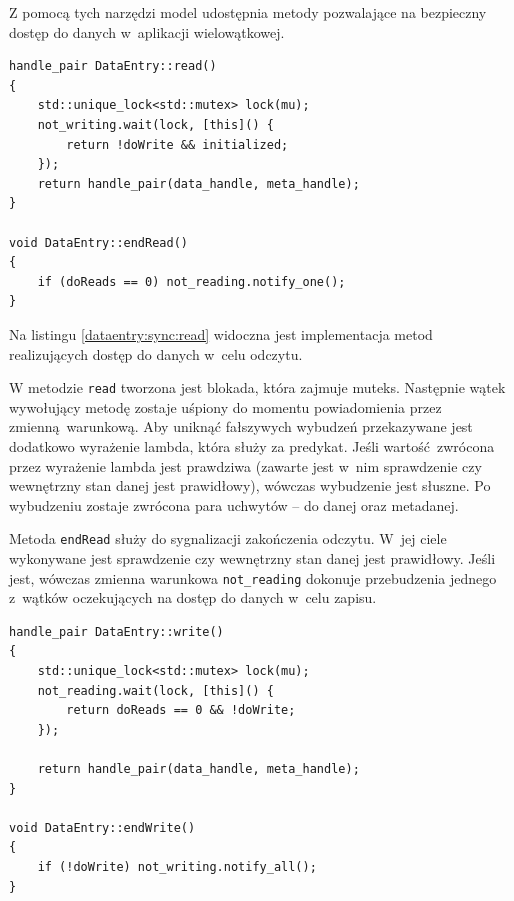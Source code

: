 Z pomocą tych narzędzi model udostępnia metody pozwalające na bezpieczny dostęp do danych w~aplikacji wielowątkowej.

\begin{minipage}{\textwidth}
	\begin{lstlisting}[label=dataentry:sync:read, caption={Metody klasy \lstinline$DataEntry$ zapewniające bezpieczny odczyt danych współdzielonych w~środowisku wielowątkowym.},alsoletter={()[].=}]
handle_pair DataEntry::read()
{
	std::unique_lock<std::mutex> lock(mu);
	not_writing.wait(lock, [this]() {
		return !doWrite && initialized;
	});
	return handle_pair(data_handle, meta_handle);
}

void DataEntry::endRead()
{
	if (doReads == 0) not_reading.notify_one();
}
	\end{lstlisting}
\end{minipage}

Na listingu \ref{dataentry:sync:read} widoczna jest implementacja metod realizujących dostęp do danych w~celu odczytu. 

W metodzie \lstinline$read$ tworzona jest blokada, która zajmuje muteks. Następnie wątek wywołujący metodę zostaje uśpiony do momentu powiadomienia przez zmienną warunkową. Aby uniknąć fałszywych wybudzeń przekazywane jest dodatkowo wyrażenie lambda, która służy za predykat. Jeśli wartość zwrócona przez wyrażenie lambda jest prawdziwa (zawarte jest w~nim sprawdzenie czy wewnętrzny stan danej jest prawidłowy), wówczas wybudzenie jest słuszne. Po wybudzeniu zostaje zwrócona para uchwytów -- do danej oraz metadanej.

Metoda \lstinline$endRead$ służy do sygnalizacji zakończenia odczytu. W~jej ciele wykonywane jest sprawdzenie czy wewnętrzny stan danej jest prawidłowy. Jeśli jest, wówczas zmienna warunkowa \lstinline$not_reading$ dokonuje przebudzenia jednego z~wątków oczekujących na dostęp do danych w~celu zapisu.

\begin{minipage}{\textwidth}
	\begin{lstlisting}[label=dataentry:sync:write, caption={Metody klasy \lstinline$DataEntry$ zapewniające bezpieczny zapis danych współdzielonych w~środowisku wielowątkowym.},alsoletter={()[].=}]
handle_pair DataEntry::write()
{
	std::unique_lock<std::mutex> lock(mu);
	not_reading.wait(lock, [this]() {
		return doReads == 0 && !doWrite;
	});

	return handle_pair(data_handle, meta_handle);
}

void DataEntry::endWrite()
{
	if (!doWrite) not_writing.notify_all();
}
	\end{lstlisting}
\end{minipage}

